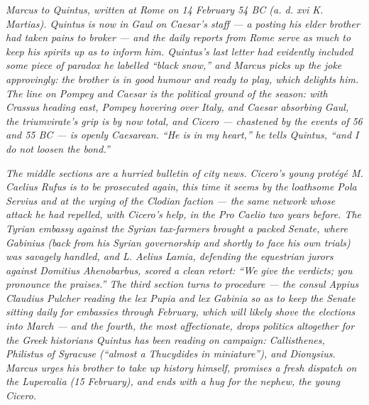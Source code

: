 
\textit{Marcus to Quintus, written at Rome on 14 February 54 BC
(\textit{a. d. xvi K. Martias}). Quintus is now in Gaul on
Caesar's staff --- a posting his elder brother had taken pains
to broker --- and the daily reports from Rome serve as much to
keep his spirits up as to inform him. Quintus's last letter
had evidently included some piece of paradox he labelled
``black snow,'' and Marcus picks up the joke approvingly: the
brother is in good humour and ready to play, which delights
him. The line on Pompey and Caesar is the political ground
of the season: with Crassus heading east, Pompey hovering
over Italy, and Caesar absorbing Gaul, the triumvirate's grip
is by now total, and Cicero --- chastened by the events of
56 and 55 BC --- is openly Caesarean. ``He is in my heart,''
he tells Quintus, ``and I do not loosen the bond.''}

\textit{The middle sections are a hurried bulletin of city
news. Cicero's young protégé M. Caelius Rufus is to be
prosecuted again, this time it seems by the loathsome Pola
Servius and at the urging of the Clodian faction --- the same
network whose attack he had repelled, with Cicero's help, in
the \textit{Pro Caelio} two years before. The Tyrian embassy
against the Syrian tax-farmers brought a packed Senate, where
Gabinius (back from his Syrian governorship and shortly to
face his own trials) was savagely handled, and L. Aelius
Lamia, defending the equestrian jurors against Domitius
Ahenobarbus, scored a clean retort: ``\textit{We} give the
verdicts; \textit{you} pronounce the praises.'' The third
section turns to procedure --- the consul Appius Claudius
Pulcher reading the lex Pupia and lex Gabinia so as to keep
the Senate sitting daily for embassies through February,
which will likely shove the elections into March --- and the
fourth, the most affectionate, drops politics altogether for
the Greek historians Quintus has been reading on campaign:
Callisthenes, Philistus of Syracuse (``almost a Thucydides
in miniature''), and Dionysius. Marcus urges his brother to
take up history himself, promises a fresh dispatch on the
Lupercalia (15 February), and ends with a hug for the
nephew, the young Cicero.}
